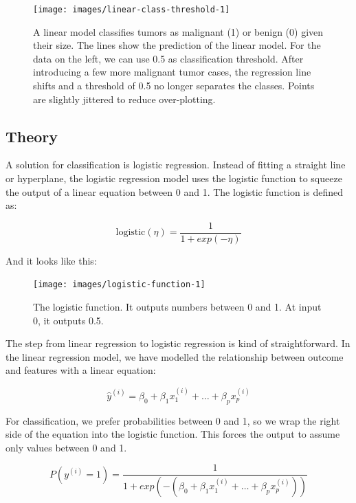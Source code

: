 \documentclass[
  12pt,
]{krantz}
\begin{document}
\begin{figure}

{\centering \texttt{[image: images/linear-class-threshold-1]} 

}

\caption{A linear model classifies tumors as malignant (1) or benign (0) given their size. The lines show the prediction of the linear model. For the data on the left, we can use 0.5 as classification threshold. After introducing a few more malignant tumor cases, the regression line shifts and a threshold of 0.5 no longer separates the classes. Points are slightly jittered to reduce over-plotting. }\label{fig:linear-class-threshold}
\end{figure}

\hypertarget{theory}{%
\subsection{Theory}\label{theory}}

A solution for classification is logistic regression.
Instead of fitting a straight line or hyperplane, the logistic regression model uses the logistic function to squeeze the output of a linear equation between 0 and 1.
The logistic function is defined as:

\[\text{logistic}(\eta)=\frac{1}{1+exp(-\eta)}\]

And it looks like this:

\begin{figure}

{\centering \texttt{[image: images/logistic-function-1]} 

}

\caption{The logistic function. It outputs numbers between 0 and 1. At input 0, it outputs 0.5.}\label{fig:logistic-function}
\end{figure}

The step from linear regression to logistic regression is kind of straightforward.
In the linear regression model, we have modelled the relationship between outcome and features with a linear equation:

\[\hat{y}^{(i)}=\beta_{0}+\beta_{1}x^{(i)}_{1}+\ldots+\beta_{p}x^{(i)}_{p}\]

For classification, we prefer probabilities between 0 and 1, so we wrap the right side of the equation into the logistic function.
This forces the output to assume only values between 0 and 1.

\[P(y^{(i)}=1)=\frac{1}{1+exp(-(\beta_{0}+\beta_{1}x^{(i)}_{1}+\ldots+\beta_{p}x^{(i)}_{p}))}\]
\end{document}

